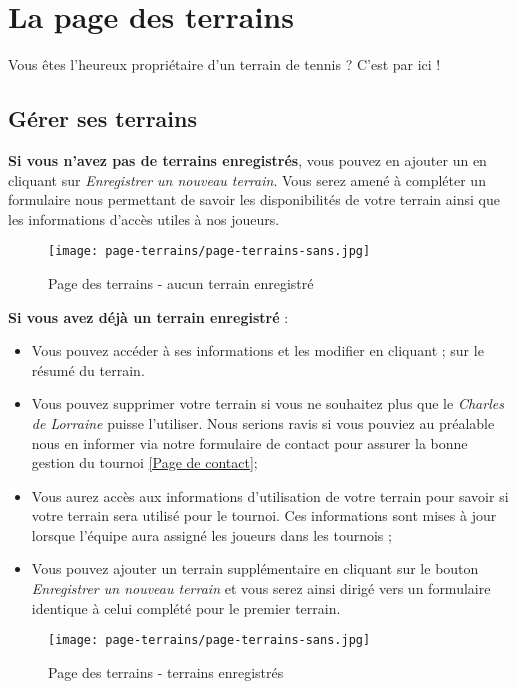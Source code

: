\section{La page des terrains}

Vous êtes l'heureux propriétaire d'un terrain de tennis ? C'est par ici !

\subsection{Gérer ses terrains}

\textbf{Si vous n'avez pas de terrains enregistrés}, vous pouvez en ajouter un
en cliquant sur \textit{Enregistrer un nouveau terrain}. Vous serez amené à
compléter un formulaire nous permettant de savoir les disponibilités de votre
terrain ainsi que les informations d'accès utiles à nos joueurs.

\begin{figure}[H]
\centering
\texttt{[image: page-terrains/page-terrains-sans.jpg]}
\caption{Page des terrains - aucun terrain enregistré}
\end{figure}

\textbf{Si vous avez déjà un terrain enregistré} :

\begin{itemize}
    \item Vous pouvez accéder à ses informations et les modifier en cliquant ;
    sur le résumé du terrain.
    \item Vous pouvez supprimer votre terrain si vous ne souhaitez plus que
    le \textit{Charles de Lorraine} puisse l'utiliser. Nous serions ravis si vous
    pouviez au préalable nous en informer via notre formulaire de contact pour
    assurer la bonne gestion du tournoi \ref{Page de contact};
    \item Vous aurez accès aux informations d'utilisation de votre terrain pour
    savoir si votre terrain sera utilisé pour le tournoi. Ces informations
    sont mises à jour lorsque l'équipe aura assigné les joueurs dans les
    tournois ;
    \item Vous pouvez ajouter un terrain supplémentaire en cliquant sur le
    bouton \textit{Enregistrer un nouveau terrain} et vous serez ainsi dirigé
    vers un formulaire identique à celui complété pour le premier terrain.
\end{itemize}

\begin{figure}[H]
\centering
\texttt{[image: page-terrains/page-terrains-sans.jpg]}
\caption{Page des terrains - terrains enregistrés}
\end{figure}
